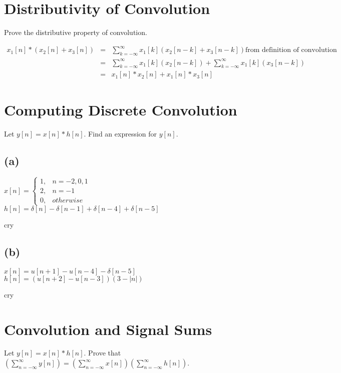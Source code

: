\documentclass[11pt]{article}
\begin{document}
\section{Distributivity of Convolution}
Prove the distributive property of convolution.

{\color{blue}
\begin{eqnarray*}
x_1[n]*\left(x_2[n]+x_3[n] \right) &=& \sum\limits_{k=-\infty}^\infty x_1[k] \left(x_2[n-k]+x_3[n-k] \right) \text{from definition of convolution} \\
&=& \sum\limits_{k=-\infty}^\infty x_1[k] \left(x_2[n-k]\right)+\sum\limits_{k=-\infty}^\infty x_1[k] \left(x_3[n-k] \right) \\
&=& x_1[n]*x_2[n] + x_1[n]*x_3[n] 
\end{eqnarray*}
}

\section{Computing Discrete Convolution}
Let $y[n]=x[n]*h[n]$. Find an expression for $y[n]$.
\subsection*{(a)}
$x[n] = \begin{cases} 1, & n = -2,0,1 \\ 2, & n = -1\\ 0, & otherwise \end{cases}$
\\
$h[n]=\delta[n]-\delta[n-1]+\delta[n-4]+\delta[n-5]$

{\color{blue}
cry
}

\subsection*{(b)}
$x[n]=u[n+1]-u[n-4]-\delta[n-5]$
\\
$h[n] = \left(u[n+2]-u[n-3]\right)\left(3-|n|\right)$

{\color{blue}
cry
}

\section{Convolution and Signal Sums}
Let $y[n] = x[n]*h[n]$. Prove that $\left( \sum\limits_{n=- \infty }^\infty y[n]\right) = \left(\sum\limits_{n=-\infty}^\infty x[n]\right)\left(\sum\limits_{n=-\infty}^\infty h[n]\right)$.
\end{document}
